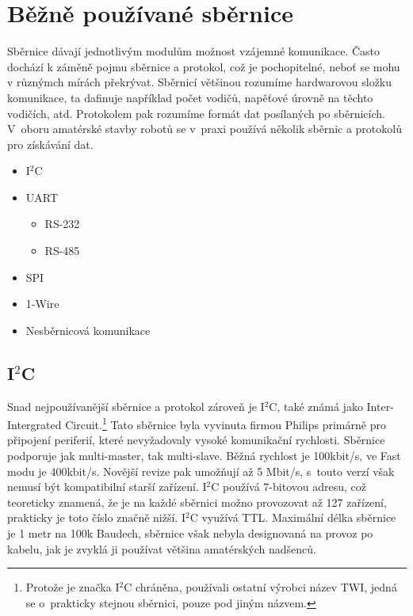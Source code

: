\chapter{Běžně používané sběrnice}
Sběrnice dávají jednotlivým modulům možnost vzájemné komunikace.
Často dochází k záměně pojmu sběrnice a protokol, což je pochopitelné, neboť se mohu v různýmch mírách překrývat.
Sběrnicí většinou rozumíme hardwarovou složku komunikace, ta dafinuje například počet vodičů, napěťové úrovně na těchto vodičích, atd.
Protokolem pak rozumíme formát dat posílaných po sběrnicích.
V~oboru amatérské stavby robotů se v~praxi používá několik sběrnic a protokolů pro získávání dat.
\begin{itemize}
	\item I$^{2}$C
	\item UART
	      \begin{itemize}
		      \item RS-232
		      \item RS-485
	      \end{itemize}
	\item SPI
	\item 1-Wire
	\item Nesběrnicová komunikace
\end{itemize}

\section{I$^{2}$C}
Snad nejpoužívanější sběrnice a protokol zároveň je I$^{2}$C,
také známá jako Inter-Intergrated Circuit.\footnote{ Protože je značka I$^{2}$C chráněna, používali ostatní výrobci název TWI, jedná se o~prakticky stejnou sběrnici, pouze pod jiným názvem.}
Tato sběrnice byla vyvinuta firmou Philips primárně pro připojení periferií, které nevyžadovaly vysoké komunikační rychlosti.
Sběrnice podporuje jak multi-master, tak multi-slave.
Běžná rychlost je 100kbit/s, ve Fast modu je 400kbit/s. Novější revize pak umožňují až 5 Mbit/s, s~touto verzí však nemusí být kompatibilní starší zařízení.
I$^{2}$C používá 7-bitovou adresu, což teoreticky znamená, že je na každé sběrnici možno provozovat až 127 zařízení, prakticky je toto číslo značně nižší.
I$^{2}$C využívá TTL.
Maximální délka sběrnice je 1 metr na 100k Baudech, sběrnice však nebyla designovaná na provoz po kabelu, jak je zvyklá ji používat většina amatérských nadšenců.\cite{nxp:UM10204}

